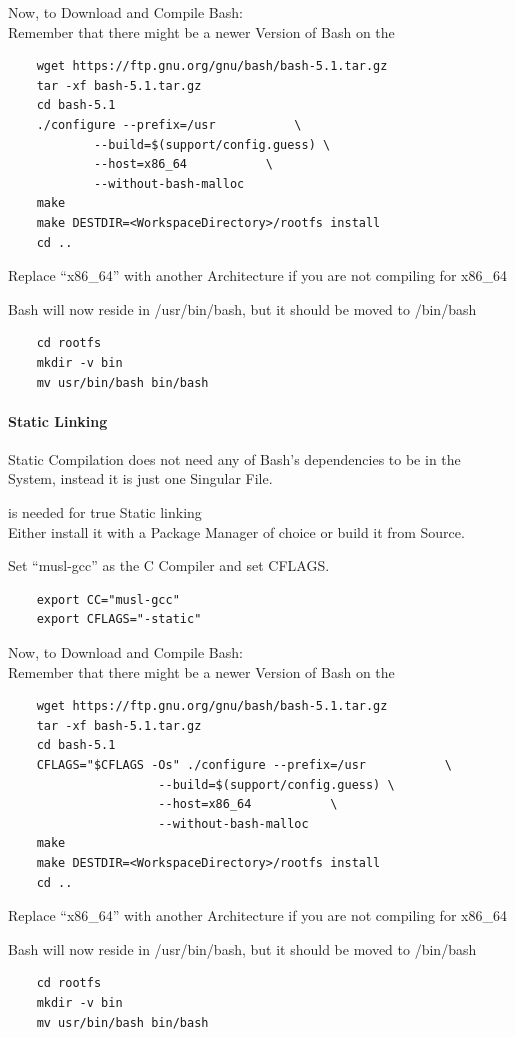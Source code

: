 \documentclass{article}
\begin{document}
		Now, to Download and Compile Bash:
		\\
		Remember that there might be a newer Version of Bash on the 
		\begin{lstlisting}
	wget https://ftp.gnu.org/gnu/bash/bash-5.1.tar.gz
	tar -xf bash-5.1.tar.gz
	cd bash-5.1
	./configure --prefix=/usr		    \
		    --build=$(support/config.guess) \
		    --host=x86_64		    \
		    --without-bash-malloc
	make
	make DESTDIR=<WorkspaceDirectory>/rootfs install
	cd ..
		\end{lstlisting}
		Replace ``x86_64'' with another Architecture if you are not compiling for x86_64

		Bash will now reside in /usr/bin/bash, but it should be moved to /bin/bash
		\begin{lstlisting}
	cd rootfs
	mkdir -v bin
	mv usr/bin/bash bin/bash
		\end{lstlisting}
		\paragraph{Static Linking}
		Static Compilation does not need any of Bash's dependencies to be in the System, instead it is just one Singular File.

		 is needed for true Static linking
		\\ Either install it with a Package Manager of choice or build it from Source.

		Set ``musl-gcc'' as the C Compiler and set CFLAGS.
		\begin{lstlisting}
	export CC="musl-gcc"
	export CFLAGS="-static"
		\end{lstlisting}
		Now, to Download and Compile Bash:
		\\
		Remember that there might be a newer Version of Bash on the 
		\begin{lstlisting}
	wget https://ftp.gnu.org/gnu/bash/bash-5.1.tar.gz
	tar -xf bash-5.1.tar.gz
	cd bash-5.1
	CFLAGS="$CFLAGS -Os" ./configure --prefix=/usr			 \
					 --build=$(support/config.guess) \
					 --host=x86_64			 \
					 --without-bash-malloc
	make
	make DESTDIR=<WorkspaceDirectory>/rootfs install
	cd ..
		\end{lstlisting}
		Replace ``x86_64'' with another Architecture if you are not compiling for x86_64

		Bash will now reside in /usr/bin/bash, but it should be moved to /bin/bash
		\begin{lstlisting}
	cd rootfs
	mkdir -v bin
	mv usr/bin/bash bin/bash
		\end{lstlisting}
\end{document}
